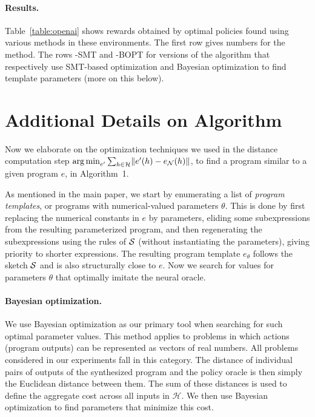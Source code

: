 \paragraph{Results.} Table~\ref{table:openai} shows rewards obtained by optimal policies found using various methods in these environments. The first row gives numbers for the \drl method. The rows \algo-SMT and \algo-BOPT  for versions of the \algo algorithm that respectively use SMT-based optimization and Bayesian optimization to find template parameters (more on this below). 


\section{Additional Details on Algorithm}\label{sec:opt}

Now we elaborate on the optimization techniques we used in the distance computation step $\argmin_{e'} \sum_{h \in \mathcal{H}} \norm{e'(h) - e_\NN(h)}$, to find a program similar to a given program $e$, in Algorithm~1.

As mentioned in the main paper, we start by enumerating a list of {\em program templates}, or programs with numerical-valued parameters $\theta$. This is  done by first replacing the numerical constants in $e$ by parameters, eliding some subexpressions from the resulting parameterized program, and then regenerating the subexpressions using the rules of $\S$ (without instantiating the parameters), giving priority to shorter expressions. The resulting program template $e_\theta$ follows the sketch $\S$ and is also structurally close to $e$. Now we search for values for parameters $\theta$ that optimally imitate the neural oracle. 

\paragraph{Bayesian optimization.}
We use Bayesian optimization as our primary tool when searching for such optimal parameter values. This method applies to problems in which actions (program outputs) can be represented as 
vectors of real numbers. All problems considered in our experiments fall in this category. The distance of individual pairs of outputs of the synthesized program and the policy oracle is then simply the Euclidean distance between them. The sum of these distances is used to define the aggregate cost across all inputs in $\mathcal{H}$. We then use Bayesian optimization to find parameters that minimize this cost.

